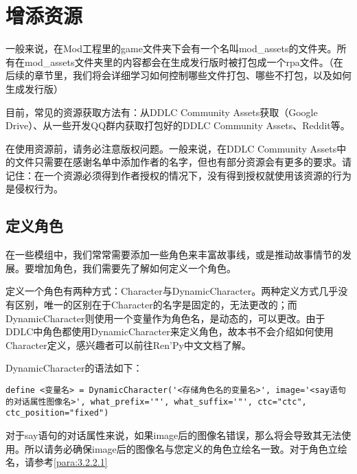 \section{增添资源}
一般来说，在Mod工程里的game文件夹下会有一个名叫mod\_assets的文件夹。所有在mod\_assets文件夹里的内容都会在生成发行版时被打包成一个rpa文件。（在后续的章节里，我们将会详细学习如何控制哪些文件打包、哪些不打包，以及如何生成发行版）

\begin{ExtraKnowledge}
    目前，常见的资源获取方法有：从DDLC Community Assets获取（Google Drive）、从一些开发QQ群内获取打包好的DDLC Community Assets、Reddit等。
\end{ExtraKnowledge}

\begin{Attention}
    在使用资源前，请务必注意版权问题。一般来说，在DDLC Community Assets中的文件只需要在感谢名单中添加作者的名字，但也有部分资源会有更多的要求。请记住：在一个资源必须得到作者授权的情况下，没有得到授权就使用该资源的行为是侵权行为。
\end{Attention}


\subsection{定义角色}
在一些模组中，我们常常需要添加一些角色来丰富故事线，或是推动故事情节的发展。要增加角色，我们需要先了解如何定义一个角色。

定义一个角色有两种方式：Character与DynamicCharacter。两种定义方式几乎没有区别，唯一的区别在于Character的名字是固定的，无法更改的；而DynamicCharacter则使用一个变量作为角色名，是动态的，可以更改。由于DDLC中角色都使用DynamicCharacter来定义角色，故本书不会介绍如何使用Character定义，感兴趣者可以前往Ren'Py中文文档了解。

DynamicCharacter的语法如下：

\begin{lstlisting}
define <变量名> = DynamicCharacter('<存储角色名的变量名>', image='<say语句的对话属性图像名>', what_prefix='"', what_suffix='"', ctc="ctc", ctc_position="fixed")
\end{lstlisting}

\begin{Warning}
    对于say语句的对话属性来说，如果image后的图像名错误，那么将会导致其无法使用。所以请务必确保image后的图像名与您定义的角色立绘名一致。对于角色立绘名，请参考\ref{para:3.2.2.1}
\end{Warning}

